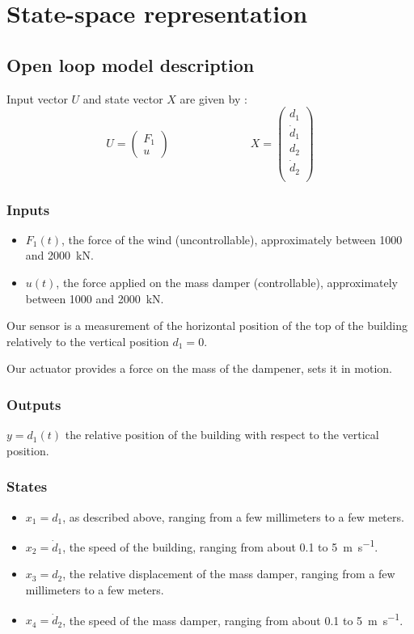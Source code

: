 \section{State-space representation}

\subsection{Open loop model description}
Input vector $U$ and state vector $X$ are given by :
$$
U = \begin{pmatrix}
    F_1 \\
    u
\end{pmatrix}
\hspace{3cm}
X = \begin{pmatrix}
    d_1 \\
    \dot d_1 \\
    d_2 \\ 
    \dot d_2 \\
\end{pmatrix}
$$

\subsubsection{Inputs}
\begin{itemize}
    \item $F_1(t)$, the force of the wind (uncontrollable), approximately between \num{1000} and \SI{2000}{\kilo\newton}.
    \item $u(t)$, the force applied on the mass damper (controllable), approximately between \num{1000} and \SI{2000}{\kilo\newton}.
\end{itemize}
Our sensor is a measurement of the horizontal position of the top of the building relatively to the vertical position $d_1 = 0$.\par
Our actuator provides a force on the mass of the dampener, sets it in motion.

\subsubsection{Outputs}
$y = d_1(t)$ the relative position of the building with respect to the vertical position.

\subsubsection{States}
\begin{itemize}
    \item $x_1 = d_1$, as described above, ranging from a few millimeters to a few meters.
    \item $x_2 = \dot d_1$, the speed of the building, ranging from about \num{0.1} to \SI{5}{\meter\per\second}.
    \item $x_3 = d_2$, the relative displacement of the mass damper, ranging from a few millimeters to a few meters.
    \item $x_4 = \dot d_2$, the speed of the mass damper, ranging from about \num{0.1} to \SI{5}{\meter\per\second}.
\end{itemize}

